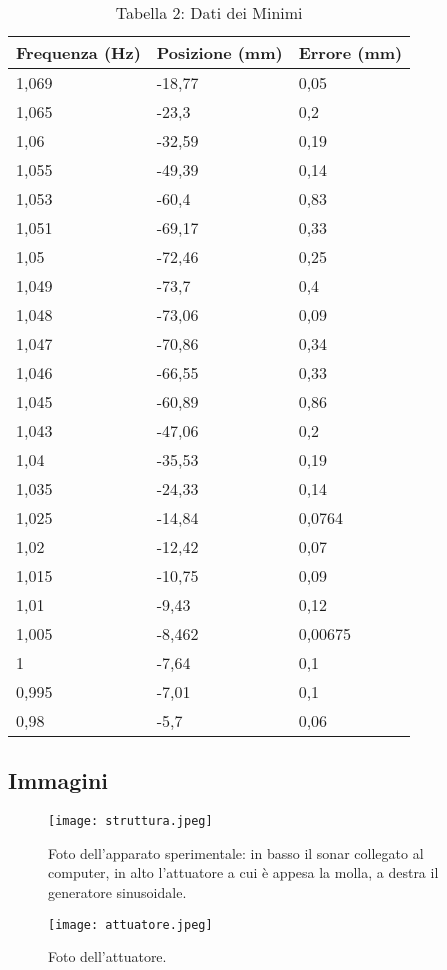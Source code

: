 \documentclass[12pt]{article}
\begin{document}
\begin{table}[ht]
\begin{minipage}{0.40\textwidth}
    \centering
    \captionsetup{labelformat=empty} %
    \caption{Tabella 2: Dati dei Minimi}
    \begin{tabularx}{\linewidth}{|X|X|X|}
      \hline
      Frequenza (Hz) & Posizione (mm) & Errore (mm) \\
      \hline
      1,069 & -18,77 & 0,05 \\
      1,065 & -23,3 & 0,2 \\
      1,06 & -32,59 & 0,19 \\
      1,055 & -49,39 & 0,14 \\
      1,053 & -60,4 & 0,83 \\
      1,051 & -69,17 & 0,33 \\
      1,05 & -72,46 & 0,25 \\
      1,049 & -73,7 & 0,4 \\
      1,048 & -73,06 & 0,09 \\
      1,047 & -70,86 & 0,34 \\
      1,046 & -66,55 & 0,33 \\
      1,045 & -60,89 & 0,86 \\
      1,043 & -47,06 & 0,2 \\
      1,04 & -35,53 & 0,19 \\
      1,035 & -24,33 & 0,14 \\
      1,025 & -14,84 & 0,0764 \\
      1,02 & -12,42 & 0,07 \\
      1,015 & -10,75 & 0,09 \\
      1,01 & -9,43 & 0,12 \\
      1,005 & -8,462 & 0,00675 \\
      1 & -7,64 & 0,1 \\
      0,995 & -7,01 & 0,1 \\
      0,98 & -5,7 & 0,06 \\
      \hline
    \end{tabularx}
  \end{minipage}
\end{table}
  
\newpage

\subsection{Immagini}

\begin{figure}[htbp]
  \centering
  \texttt{[image: struttura.jpeg]}
  \captionsetup{labelformat=empty}
  \caption{Foto dell'apparato sperimentale: in basso il sonar collegato al computer, in alto l'attuatore a cui è appesa la molla, a destra il generatore sinusoidale.}
  \label{fig:struttura.jpeg}
\end{figure}

\begin{figure}[htbp]
  \centering
  \texttt{[image: attuatore.jpeg]}
  \captionsetup{labelformat=empty}
  \caption{Foto dell'attuatore.}
  \label{fig:attuatore.jpeg}
\end{figure}
\end{document}
